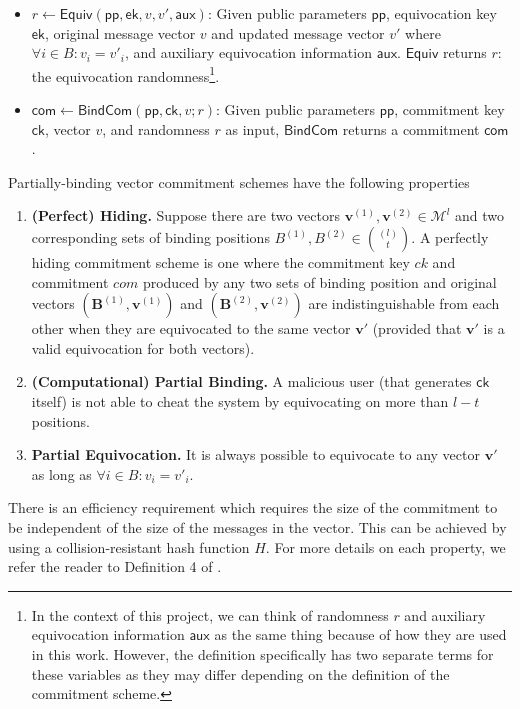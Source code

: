 \begin{definition}
\begin{itemize}
  \item $r \leftarrow \mathsf{Equiv}(\mathsf{pp},\mathsf{ek},v,v',\mathsf{aux})$: Given public parameters $\mathsf{pp}$, 
  equivocation key $\mathsf{ek}$, original message vector $v$ and updated message vector $v'$ 
  where $\forall i \in B: v_i = v'_i$, and auxiliary equivocation information $\mathsf{aux}$. $\mathsf{Equiv}$ returns $r$: the equivocation randomness\footnote{In the context of this project, we can think of randomness $r$ and auxiliary equivocation information $\mathsf{aux}$ as the same thing because of how they are used in this work. However, the definition specifically has two separate terms for these variables as they may differ depending on the definition of the commitment scheme.}. 

  \item $\mathsf{com} \leftarrow \mathsf{BindCom}(\mathsf{pp}, \mathsf{ck}, v; r)$: Given public parameters 
  $\mathsf{pp}$, commitment key $\mathsf{ck}$, vector $v$, and randomness $r$ as input, $\mathsf{BindCom}$ returns a commitment 
  $\mathsf{com}$.
  \end{itemize}

  Partially-binding vector commitment schemes have the following properties
  
  \begin{enumerate}
    \item \textbf{(Perfect) Hiding.} Suppose there are two vectors $\mathbf{v}^{(1)}, \mathbf{v}^{(2)} \in \mathcal M^l$ and two corresponding sets of 
    binding positions $B^{(1)}, B^{(2)} \in {(l) \choose t}$. A perfectly hiding commitment scheme is one where the commitment key $ck$ and commitment $com$ 
    produced by any two sets of binding position and original vectors $(\mathbf{B}^{(1)}, \mathbf{v}^{(1)})$ and $(\mathbf{B}^{(2)}, \mathbf{v}^{(2)})$ are 
    indistinguishable from each other when they are equivocated to the same vector $\mathbf{v}'$ (provided that $\mathbf{v}'$ is a valid equivocation for 
    both vectors). 

    \item \textbf{(Computational) Partial Binding.} A malicious user (that generates $\mathsf{ck}$ itself) is not able to cheat the system by equivocating 
    on more than $l - t$ positions.

    \item \textbf{Partial Equivocation.} It is always possible to equivocate to any vector $\mathbf{v}'$ as long as $\forall i \in B: v_i = v'_i$. 
  \end{enumerate}

  There is an efficiency requirement which requires the size of the commitment to be independent of the size of the messages 
  in the vector. This can be achieved by using a collision-resistant hash function $H$. 
  For more details on each property, we refer the reader to Definition 4 of \cite{StackingSigmas}. 
\end{definition}


